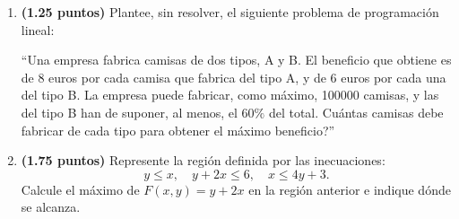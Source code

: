 
\begin{enumerate}[label=\alph*)]
\item \textbf{(1.25 puntos)} Plantee, sin resolver, el siguiente problema de programación lineal:

``Una empresa fabrica camisas de dos tipos, A y B. El beneficio que obtiene es de 8 euros por cada camisa que fabrica del tipo A, y de 6 euros por cada una del tipo B. La empresa puede fabricar, como máximo, 100000 camisas, y las del tipo B han de suponer, al menos, el $60\%$ del total. \textquestiondown{}Cuántas camisas debe fabricar de cada tipo para obtener el máximo beneficio?''
\item \textbf{(1.75 puntos)} Represente la región definida por las inecuaciones:
\[
y\leq x,\quad y+2x\leq6,\quad x\leq4y+3.
\]
Calcule el máximo de $F(x,y)=y+2x$ en la región anterior e indique dónde se alcanza.
\end{enumerate}
